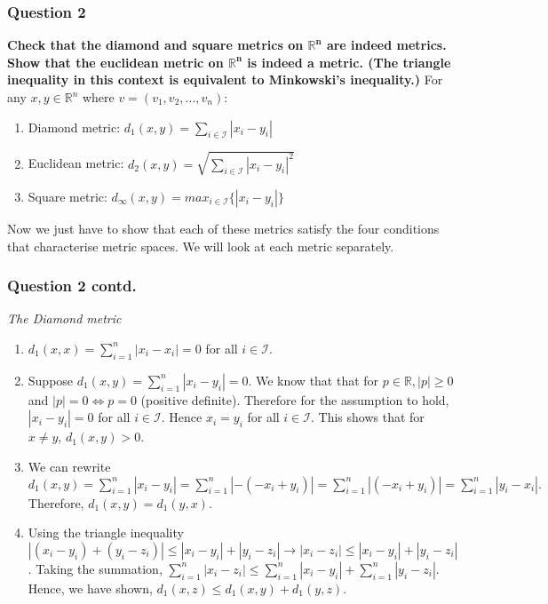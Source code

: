 \begin{frame}
\frametitle{Question 2}
\textbf{Check that the diamond and square metrics on $\bm{\mathbb{R}^n}$ are indeed metrics. Show that the euclidean metric on $\bm{\mathbb{R}^n}$ is indeed a metric. (The triangle inequality in this context is equivalent to Minkowski’s inequality.)}\hfill\break
\hfill\break
For any $x, y \in \mathbb{R}^n $ where $v = (v_1, v_2,...,v_n)$: 
\begin{enumerate}
    \item Diamond metric: $d_1(x,y) = \sum_{i\in \mathcal{I}} |x_i - y_i| $
    \item Euclidean metric: $d_2(x,y) = \sqrt{\sum_{i\in \mathcal{I}} |x_i - y_i|^2} $
    \item Square metric: $d_{\infty}(x,y) = max_{i\in \mathcal{I}}\{|x_i - y_i|\}$
\end{enumerate}
\hfill\break
Now we just have to show that each of these metrics satisfy the four conditions that characterise metric spaces. We will look at each metric separately.
\end{frame}

\begin{frame}
\frametitle{Question 2 contd.}
\textit{The Diamond metric}\hfill\break
\begin{enumerate}
    \item $d_1(x,x) = \sum_{i=1}^{n} |x_i - x_i| = 0$ for all $i\in \mathcal{I}.$
    \item Suppose $d_1(x,y) = \sum_{i=1}^{n} |x_i - y_i| = 0$. We know that that for $p \in \mathbb{R}, |p|\geq 0$ and $|p| = 0 \iff p = 0$ (positive definite). Therefore for the assumption to hold, $|x_i - y_i| = 0$ for all $i \in \mathcal{I}$. Hence $x_i = y_i$ for all $i \in \mathcal{I}$. This shows that for $x\neq y$, $d_1(x,y)>0$.
    \item We can rewrite $d_1(x,y) = \sum_{i=1}^{n} |x_i - y_i| = \sum_{i=1}^{n} |- (- x_i + y_i)| = \sum_{i=1}^{n} |(- x_i + y_i)| = \sum_{i=1}^{n} |y_i - x_i |.$ Therefore, $d_1(x,y) = d_1(y,x).$
    \item Using the triangle inequality $|(x_i - y_i) + (y_i - z_i)| \leq |x_i - y_i| + |y_i - z_i| \rightarrow |x_i - z_i| \leq |x_i - y_i| + |y_i - z_i|$. Taking the summation, $\sum_{i=1}^{n}|x_i - z_i| \leq \sum_{i=1}^{n}|x_i - y_i| + \sum_{i=1}^{n}|y_i - z_i|$. Hence, we have shown, $d_1(x,z) \leq d_1(x,y)+d_1(y,z).$
\end{enumerate}
\end{frame}

